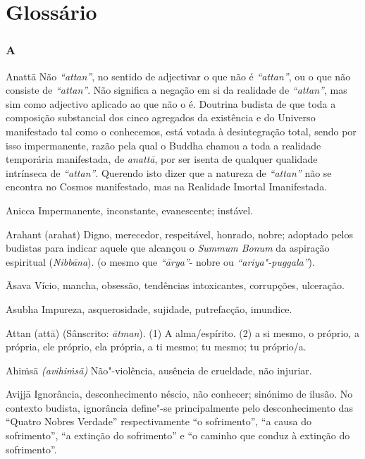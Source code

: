 \chapter{Glossário}

\subsection{A}

\begin{glossarydescription}

\item[Anattā] Não \emph{``attan''}, no sentido de adjectivar o que não é
\emph{``attan''}, ou o que não consiste de \emph{``attan''}. Não significa a
negação em si da realidade de \emph{``attan''}, mas sim como adjectivo
aplicado ao que não o é. Doutrina budista de que toda a composição substancial
dos cinco agregados da existência e do Universo manifestado tal como o
conhecemos, está votada à desintegração total, sendo por isso impermanente,
razão pela qual o Buddha chamou a toda a realidade temporária manifestada, de
\emph{anattā}, por ser isenta de qualquer qualidade intrínseca de
\emph{``attan''}. Querendo isto dizer que a natureza de \emph{``attan''} não
se encontra no Cosmos manifestado, mas na Realidade Imortal Imanifestada.

\item[Anicca] Impermanente, inconstante, evanescente; instável.

\item[Arahant (arahat)] Digno, merecedor, respeitável, honrado, nobre; adoptado
pelos budistas para indicar aquele que alcançou o \emph{Summum Bonum} da
aspiração espiritual (\emph{Nibbāna}). (o mesmo que \emph{``ārya''}- nobre ou
\emph{``ariya"-puggala''}).

\item[Āsava] Vício, mancha, obsessão, tendências intoxicantes, corrupções,
ulceração.

\item[Asubha] Impureza, asquerosidade, sujidade, putrefacção, imundice.

\item[Attan (attā)] (Sânscrito: \emph{ātman}). (1) A alma/espírito. (2) a si
mesmo, o próprio, a própria, ele próprio, ela própria, a ti mesmo; tu mesmo; tu
próprio/a.

\item[Ahiṁsā] \emph{(avihiṁsā)} Não"-violência, ausência de crueldade, não
injuriar.

\item[Avijjā] Ignorância, desconhecimento néscio, não conhecer; sinónimo de
ilusão. No contexto budista, ignorância define"-se principalmente pelo
desconhecimento das ``Quatro Nobres Verdade'' respectivamente ``o sofrimento'',
``a causa do sofrimento'', ``a extinção do sofrimento'' e ``o caminho que conduz
à extinção do sofrimento''.

\end{glossarydescription}

